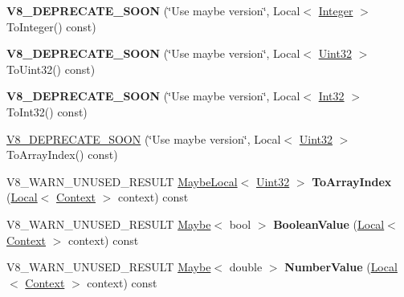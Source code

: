 \begin{DoxyCompactItemize}
\item 
\hypertarget{classv8_1_1Value_aaf6d45da85632495545435e44ed2eeab}{}{\bfseries V8\+\_\+\+D\+E\+P\+R\+E\+C\+A\+T\+E\+\_\+\+S\+O\+O\+N} (\char`\"{}Use maybe version\char`\"{}, Local$<$ \hyperlink{classv8_1_1Integer}{Integer} $>$ To\+Integer() const)\label{classv8_1_1Value_aaf6d45da85632495545435e44ed2eeab}

\item 
\hypertarget{classv8_1_1Value_ab1a06e5e80b70f38389d8add992e4b2a}{}{\bfseries V8\+\_\+\+D\+E\+P\+R\+E\+C\+A\+T\+E\+\_\+\+S\+O\+O\+N} (\char`\"{}Use maybe version\char`\"{}, Local$<$ \hyperlink{classv8_1_1Uint32}{Uint32} $>$ To\+Uint32() const)\label{classv8_1_1Value_ab1a06e5e80b70f38389d8add992e4b2a}

\item 
\hypertarget{classv8_1_1Value_a105c830761d2a094edc64d99a4c06f55}{}{\bfseries V8\+\_\+\+D\+E\+P\+R\+E\+C\+A\+T\+E\+\_\+\+S\+O\+O\+N} (\char`\"{}Use maybe version\char`\"{}, Local$<$ \hyperlink{classv8_1_1Int32}{Int32} $>$ To\+Int32() const)\label{classv8_1_1Value_a105c830761d2a094edc64d99a4c06f55}

\item 
\hyperlink{classv8_1_1Value_a48ae008760161c7ae7fd54a9db9cffcf}{V8\+\_\+\+D\+E\+P\+R\+E\+C\+A\+T\+E\+\_\+\+S\+O\+O\+N} (\char`\"{}Use maybe version\char`\"{}, Local$<$ \hyperlink{classv8_1_1Uint32}{Uint32} $>$ To\+Array\+Index() const)
\item 
\hypertarget{classv8_1_1Value_abac68de66288d00b3b612c20e5059515}{}V8\+\_\+\+W\+A\+R\+N\+\_\+\+U\+N\+U\+S\+E\+D\+\_\+\+R\+E\+S\+U\+L\+T \hyperlink{classv8_1_1MaybeLocal}{Maybe\+Local}$<$ \hyperlink{classv8_1_1Uint32}{Uint32} $>$ {\bfseries To\+Array\+Index} (\hyperlink{classv8_1_1Local}{Local}$<$ \hyperlink{classv8_1_1Context}{Context} $>$ context) const \label{classv8_1_1Value_abac68de66288d00b3b612c20e5059515}

\item 
\hypertarget{classv8_1_1Value_ae6e855a09c4b60ec2c4674731d0d365c}{}V8\+\_\+\+W\+A\+R\+N\+\_\+\+U\+N\+U\+S\+E\+D\+\_\+\+R\+E\+S\+U\+L\+T \hyperlink{classv8_1_1Maybe}{Maybe}$<$ bool $>$ {\bfseries Boolean\+Value} (\hyperlink{classv8_1_1Local}{Local}$<$ \hyperlink{classv8_1_1Context}{Context} $>$ context) const \label{classv8_1_1Value_ae6e855a09c4b60ec2c4674731d0d365c}

\item 
\hypertarget{classv8_1_1Value_a3dcd02e3d5ee791e0c42c7f2ebfedbaf}{}V8\+\_\+\+W\+A\+R\+N\+\_\+\+U\+N\+U\+S\+E\+D\+\_\+\+R\+E\+S\+U\+L\+T \hyperlink{classv8_1_1Maybe}{Maybe}$<$ double $>$ {\bfseries Number\+Value} (\hyperlink{classv8_1_1Local}{Local}$<$ \hyperlink{classv8_1_1Context}{Context} $>$ context) const \label{classv8_1_1Value_a3dcd02e3d5ee791e0c42c7f2ebfedbaf}


\end{DoxyCompactItemize}
